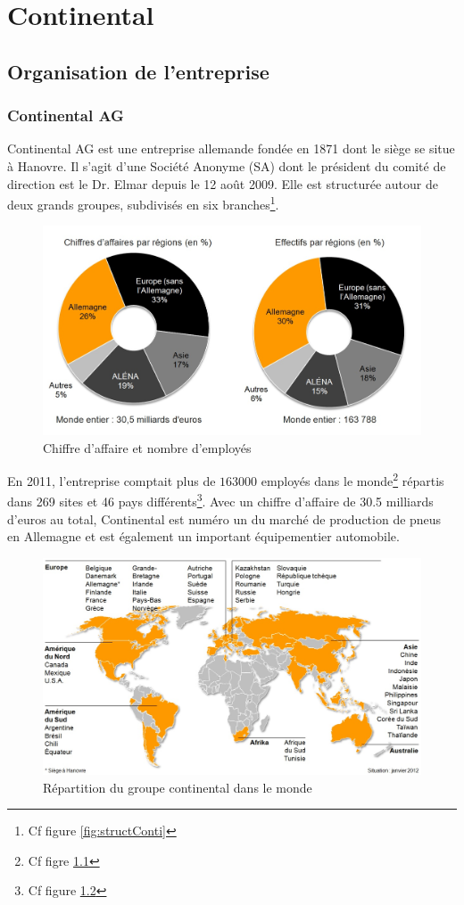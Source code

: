 \chapter{Continental}
	\section{Organisation de l'entreprise}
		\subsection{Continental AG}
Continental AG est une entreprise allemande fondée en 1871 dont le siège se situe à Hanovre. Il s'agit d'une Société Anonyme (SA) dont le président du comité de direction est le Dr. Elmar  depuis le 12 août 2009. Elle est structurée autour de deux grands groupes, subdivisés en six branches\footnote{Cf figure \ref{fig:structConti}}.
	 
		 \begin{figure}[H]
		 	\centering
		 	\includegraphics[width=12cm]{contents/images/caConti.jpg}
		 	\caption{Chiffre d'affaire et nombre d'employés}
		 	\label{fig:caConti}
		 \end{figure}

		 En 2011, l'entreprise comptait plus de $163000$ employés dans le monde\footnote{Cf figre \ref{fig:caConti}} répartis dans 269 sites et 46 pays différents\footnote{Cf figure \ref{fig:repartitionConti}}. Avec un chiffre d'affaire de 30.5 milliards d'euros au total, Continental est numéro un du marché de production de pneus en Allemagne et est également un important équipementier automobile.
		 \begin{figure}[H]
		 	\centering
		 	\includegraphics[width=13cm]{contents/images/repartitionConti.jpg}
		 	\caption{Répartition du groupe continental dans le monde}
		 	\label{fig:repartitionConti}
		 \end{figure}		 

